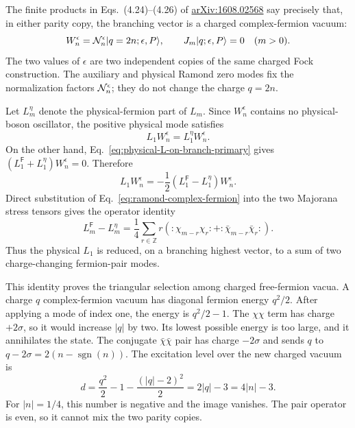 \documentclass[11pt]{article}
\newcommand{\Ff}{\mathsf F}
\begin{document}
The finite products in Eqs.~(4.24)--(4.26) of
\href{https://arxiv.org/abs/1608.02568}{arXiv:1608.02568} say precisely that,
in either parity copy, the branching vector is a charged complex-fermion
vacuum:
\begin{equation}
 W_n^\epsilon={\cal N}_n^\epsilon
 |q=2n;\epsilon,P\rangle,
 \qquad
 J_m|q;\epsilon,P\rangle=0\quad(m>0).
 \label{eq:ramond-W-as-charged-vacuum}
\end{equation}
The two values of \(\epsilon\) are two independent copies of the same
charged Fock construction.  The auxiliary and physical Ramond zero modes
fix the normalization factors \({\cal N}_n^\epsilon\); they do not change the
charge \(q=2n\).

Let \(L_m^\eta\) denote the physical-fermion part of \(L_m\).  Since
\(W_n^\epsilon\) contains no physical-boson oscillator, the positive
physical mode satisfies
\begin{equation}
 L_1W_n^\epsilon=L_1^\eta W_n^\epsilon.
\end{equation}
On the other hand, Eq.~\eqref{eq:physical-L-on-branch-primary} gives
\((L_1^{\Ff}+L_1^\eta)W_n^\epsilon=0\).  Therefore
\begin{equation}
 L_1W_n^\epsilon
 =-\frac12(L_1^{\Ff}-L_1^\eta)W_n^\epsilon.
 \label{eq:ramond-L1-stress-difference}
\end{equation}
Direct substitution of Eq.~\eqref{eq:ramond-complex-fermion} into the two
Majorana stress tensors gives the operator identity
\begin{equation}
 L_m^{\Ff}-L_m^\eta
 =\frac14\sum_{r\in\mathbb Z}r\left(
 :\!\chi_{m-r}\chi_r\!:
 +:\!\bar\chi_{m-r}\bar\chi_r\!:
 \right).
 \label{eq:ramond-stress-difference-pairs}
\end{equation}
Thus the physical \(L_1\) is reduced, on a branching highest vector, to a
sum of two charge-changing fermion-pair modes.

This identity proves the triangular selection among charged free-fermion
vacua.  A charge
\(q\) complex-fermion vacuum has diagonal fermion energy \(q^2/2\).
After applying a mode of index one, the energy is \(q^2/2-1\).  The
\(\chi\chi\) term has charge \(+2\sigma\), so it would increase \(|q|\) by
two.  Its lowest possible energy is too large, and it annihilates the
state.  The conjugate \(\bar\chi\bar\chi\) pair has charge
\(-2\sigma\) and sends
\(q\) to \(q-2\sigma=2(n-\operatorname{sgn}(n))\).  The excitation level
over the new charged vacuum is
\begin{equation}
 d=\frac{q^2}{2}-1-\frac{(|q|-2)^2}{2}
  =2|q|-3=4|n|-3.
 \label{eq:ramond-pair-descendant-level}
\end{equation}
For \(|n|=1/4\), this number is negative and the image vanishes.  The pair
operator is even, so it cannot mix the two parity copies.
\end{document}
